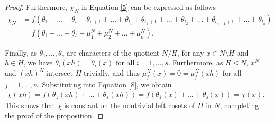 \documentclass[twoside,a4paper,reqno,11pt]{amsart}
\newcommand{\<}{\langle}
\renewcommand{\>}{\rangle}
\renewcommand{\:}{\colon}
\theoremstyle{definition}
\begin{document}
\begin{proof}
	Furthermore, $\chi_N$ in Equation \eqref{5} can be expressed as follows
	\begin{align}\label{8}
		\chi_N &=f (\theta_1+\ldots+\theta_s+\theta_{s+1}+\ldots+\theta_{l_1}+\theta_{l_1+1}+\ldots+\theta_{l_2}+\ldots+\theta_{l_{n-1}+1}+\ldots+\theta_{l_n}) \nonumber\\
		&= f(\theta_1+\ldots+\theta_s + \mu_1^N + \mu_2^N+\ldots +\mu_n^N).
	\end{align}
	
	
	Finally, as $\theta_1,\ldots,\theta_s$ are characters of the quotient $N/H$, for any $x \in N\setminus H$ and  $h\in H$, we have $\theta_i(xh) = \theta_i(x)$ for all $i = 1,\ldots,s$. Furthermore, as $H\unlhd N$, $x^N$ and $(xh)^N$ intersect $H$ trivially, and thus $\mu_j^N(x) = 0 = \mu_j^N(xh)$ for all $j=1,\ldots,n$. Substituting into  Equation \eqref{8}, we obtain
	\begin{align*}
		\chi(xh) = f(\theta_1(xh) + \ldots+\theta_s(xh)) = f(\theta_1(x) + \ldots + \theta_s(x)) = \chi(x).
	\end{align*} This shows that $\chi$ is constant on the nontrivial left cosets of $H$ in $N$, completing the proof of the proposition.
\end{proof}
\end{document}
